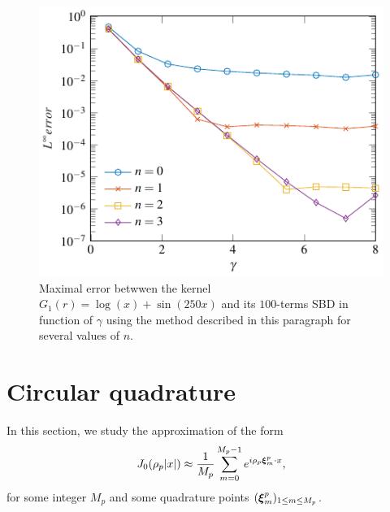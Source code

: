 \documentclass[smallextended]{svjour3}
\begin{document}
\begin{figure}[H]	
	\setlength{\plotwidth}{0.7\textwidth}
	\centering
	\includegraphics[scale = 0.8]{LinfVsGamma_arbitraryKern}
	\caption{Maximal error betwwen the kernel $G_1(r) =  \log(x) + \sin(250x)$ and its $100$-terms SBD in function of $\gamma$ using the method described in this paragraph for several values of $n$.}
	\label{figArbitraryKernel}
\end{figure}																									
																														
\section{Circular quadrature}
\label{sec:circular}
In this section, we study the approximation of the form
\[ J_0(\rho_p|x|) \approx \dfrac{1}{M_p}\sum_{m=0}^{M_p-1}e^{i \rho_p \boldsymbol{\xi}^p_m \cdot x}, \]
for some integer $M_p$ and some quadrature points $(\boldsymbol{\xi}_m^p)_{1 \leq m \leq M_p}$. 
																														
\end{document}

